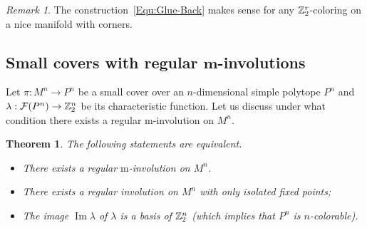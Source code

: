 \documentclass[12pt]{amsart}
\theoremstyle{plain} \numberwithin{equation}{section}
\newtheorem{thm}{Theorem}[section]
\theoremstyle{definition}
\theoremstyle{remark}
\newtheorem{rem}{Remark}
\begin{document}
   \begin{rem}
    The construction~\eqref{Equ:Glue-Back} makes sense for 
    any ${\Bbb Z}_2^r$-coloring on a nice manifold with corners.
    \end{rem} 

  \subsection{Small covers with regular $\mathbf{m}$-involutions}\label{involution}
  Let $\pi: M^n\rightarrow P^n$ be a small cover over an $n$-dimensional simple polytope $P^n$ 
  and $\lambda: \mathcal{F}(P^n)\rightarrow {\Bbb Z}_2^n$ be its characteristic
function. Let us discuss under what condition there exists a regular $\mathrm{m}$-involution 
on $M^n$.

\begin{thm}\label{max-involution}
The following statements are equivalent.
\begin{itemize}
\item[(a)] There exists a regular $\mathrm{m}$-involution on $M^n$.
\item[(b)] There exists a regular involution on $M^n$ with only isolated fixed points;
\item[(c)] The image $\operatorname{Im} \lambda$ of $\lambda$ 
   is a basis of ${\Bbb Z}_2^n$ (which implies that $P^n$ is
 $n$-colorable).
\end{itemize}
\end{thm}
\end{document}
